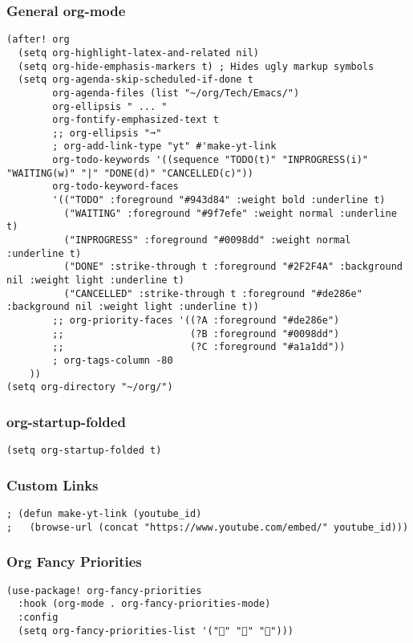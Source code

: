 \documentclass[11pt]{article}
\begin{document}
\subsubsection{General org-mode}
\label{sec:org8534359}
\begin{verbatim}
(after! org
  (setq org-highlight-latex-and-related nil)
  (setq org-hide-emphasis-markers t) ; Hides ugly markup symbols
  (setq org-agenda-skip-scheduled-if-done t
        org-agenda-files (list "~/org/Tech/Emacs/")
        org-ellipsis " ... "
        org-fontify-emphasized-text t
        ;; org-ellipsis "➞"
        ; org-add-link-type "yt" #'make-yt-link
        org-todo-keywords '((sequence "TODO(t)" "INPROGRESS(i)" "WAITING(w)" "|" "DONE(d)" "CANCELLED(c)"))
        org-todo-keyword-faces
        '(("TODO" :foreground "#943d84" :weight bold :underline t)
          ("WAITING" :foreground "#9f7efe" :weight normal :underline t)
          ("INPROGRESS" :foreground "#0098dd" :weight normal :underline t)
          ("DONE" :strike-through t :foreground "#2F2F4A" :background nil :weight light :underline t)
          ("CANCELLED" :strike-through t :foreground "#de286e" :background nil :weight light :underline t))
        ;; org-priority-faces '((?A :foreground "#de286e")
        ;;                      (?B :foreground "#0098dd")
        ;;                      (?C :foreground "#a1a1dd"))
        ; org-tags-column -80
    ))
(setq org-directory "~/org/")
\end{verbatim}
\subsubsection{org-startup-folded}
\label{sec:org57cdb10}
\begin{verbatim}
(setq org-startup-folded t)
\end{verbatim}
\subsubsection{Custom Links}
\label{sec:org7c1c77b}
\begin{verbatim}
; (defun make-yt-link (youtube_id)
;   (browse-url (concat "https://www.youtube.com/embed/" youtube_id)))
\end{verbatim}
\subsubsection{Org Fancy Priorities}
\label{sec:orgbfdc37e}
\begin{verbatim}
(use-package! org-fancy-priorities
  :hook (org-mode . org-fancy-priorities-mode)
  :config
  (setq org-fancy-priorities-list '("" "" "")))
\end{verbatim}
\end{document}
